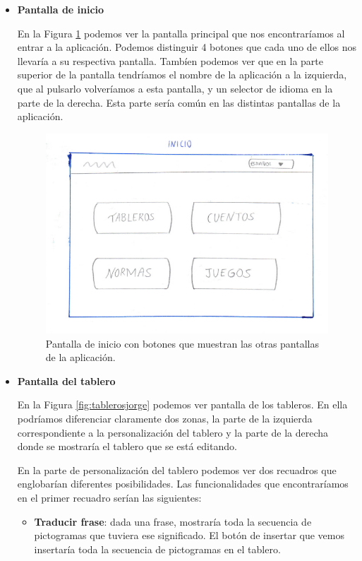 \begin{itemize}
	\item \textbf{Pantalla de inicio}
	
	En la Figura \ref{fig:iniciojorge} podemos ver la pantalla principal que nos encontraríamos al entrar a la aplicación. Podemos distinguir 4 botones que cada uno de ellos nos llevaría a su respectiva pantalla. 
	Tambíen podemos ver que en la parte superior de la pantalla tendríamos el nombre de la aplicación a la izquierda, que al pulsarlo volveríamos a esta pantalla, y un selector de idioma en la parte de la derecha. Esta parte sería común en las distintas pantallas de la aplicación.
	
	
\begin{figure}[h!]
	\centering
	\includegraphics[width=0.7\linewidth]{Imagenes/Bitmap/inicioJorge}
	\caption{Pantalla de inicio con botones que muestran las otras pantallas de la aplicación.}
	\label{fig:iniciojorge}
\end{figure}

	
	\item \textbf{Pantalla del tablero}
	
	En la Figura \ref{fig:tablerosjorge} podemos ver pantalla de los tableros. En ella podríamos diferenciar claramente dos zonas, la parte de la izquierda correspondiente a la personalización del tablero y la parte de la derecha donde se mostraría el tablero que se está editando.
	
	
	En la parte de personalización del tablero podemos ver dos recuadros que englobarían diferentes posibilidades. Las funcionalidades que encontraríamos en el primer recuadro serían las siguientes:
	
	\begin{itemize}
		\item \textbf{Traducir frase}: dada una frase, mostraría toda la secuencia de pictogramas que tuviera ese significado. El botón de insertar que vemos insertaría toda la secuencia de pictogramas en el tablero.
		

\end{itemize}
\end{itemize}
